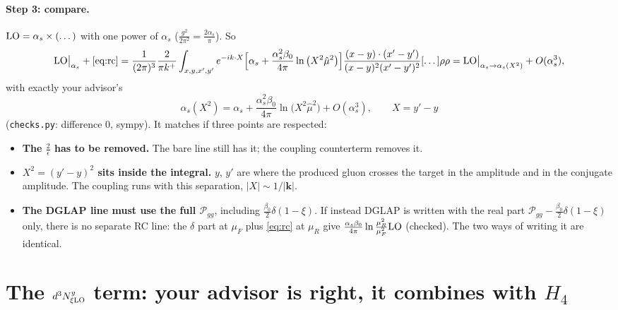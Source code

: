 \documentclass[10pt]{article}
\numberwithin{equation}{section}
\newcommand{\LO}{{\rm LO}}
\begin{document}
\paragraph{Step 3: compare.} $\LO=\alpha_s\times(\dots)$ with one power of $\alpha_s$ ($\frac{g^2}{2\pi^2}=\frac{2\alpha_s}{\pi}$). So
\begin{equation}
\LO\big|_{\alpha_s}+\eqref{eq:rc}=\frac{1}{(2\pi)^3}\frac{2}{\pi k^+}\int_{x,y,x',y'}e^{-ik\cdot X}\Big[\alpha_s+\frac{\alpha_s^2\beta_0}{4\pi}\ln\big(X^2\hat\mu^2\big)\Big]\frac{(x-y)\cdot(x'-y')}{(x-y)^2(x'-y')^2}[\dots]\rho\rho
=\LO\big|_{\alpha_s\to\alpha_s(X^2)}+O(\alpha_s^3),
\end{equation}
with exactly your advisor's
\begin{equation}
\alpha_s(X^2)=\alpha_s+\frac{\alpha_s^2\beta_0}{4\pi}\ln\big(X^2\hat\mu^2\big)+O(\alpha_s^3),\qquad X=y'-y
\end{equation}
(\texttt{checks.py}: difference $0$, sympy). It matches if three points are respected:
\begin{itemize}
\item \textbf{The $\frac2\epsilon$ has to be removed.} The bare line still has it; the coupling counterterm removes it.
\item \textbf{$X^2=(y'-y)^2$ sits inside the integral.} $y$, $y'$ are where the produced gluon crosses the target in the amplitude and in the conjugate amplitude. The coupling runs with this separation, $|X|\sim1/|\mathbf k|$.
\item \textbf{The DGLAP line must use the full $\mathcal P_{gg}$}, including $\frac{\beta_0}{2}\delta(1-\xi)$. If instead DGLAP is written with the real part $\mathcal P_{gg}-\frac{\beta_0}{2}\delta(1-\xi)$ only, there is no separate RC line: the $\delta$ part at $\mu_F$ plus \eqref{eq:rc} at $\mu_R$ give $\frac{\alpha_s\beta_0}{4\pi}\ln\frac{\mu_R^2}{\mu_F^2}\LO$ (checked). The two ways of writing it are identical.
\end{itemize}

\section{The \texorpdfstring{$d^3N^y_{\xi\rm LO}$}{d3Ny} term: your advisor is right, it combines with \texorpdfstring{$H_4$}{H4}}
\end{document}
